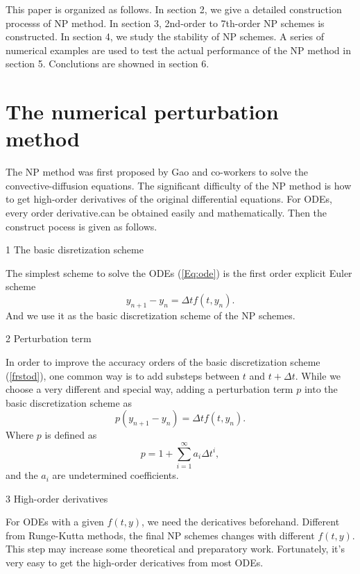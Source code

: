 \documentclass[review]{elsarticle}
\theoremstyle{plain}\newtheorem{definition}{\sc{Definition}}
\theoremstyle{defination}\newtheorem{example}{Example}[section]
\numberwithin{equation}{section}
\numberwithin{table}{section}
\begin{document}
{This paper is organized as follows. In section 2, we give a detailed construction processs of NP method. In section 3, 2nd-order to 7th-order NP schemes is constructed. In section 4, we study the stability of NP schemes. A series of numerical examples are used to test the actual performance of the NP method in section 5.  Conclutions are showned in section 6.   

\section{The numerical perturbation method}
The NP method was first proposed by Gao and co-workers to solve the convective-diffusion equations. The significant difficulty of the NP method is how  to get high-order derivatives of the original differential equations. For ODEs, every order derivative.can be obtained easily and mathematically.  Then the construct pocess is given as follows.

\textcircled{\small{1}} The basic disretization scheme

The simplest scheme to solve the ODEs (\ref{Eq:ode}) is the first order explicit Euler scheme
\begin{equation}\label{frstod}
  y_{n+1}-y_n=\Delta t f(t,y_n).
\end{equation}
And we use it as the  basic discretization scheme of the NP schemes.

\textcircled{\small{2}} Perturbation term

In order to improve the accuracy orders of the basic discretization scheme (\ref{frstod}), one common way is to add substeps between $t$ and $t+\Delta t$. While  we choose a  very different and special way, adding  a perturbation term $p$ into the basic discretization scheme as
\begin{equation}\label{eq:pEuler}
  p(y_{n+1}-y_n)=\Delta t f(t,y_n).
  \end{equation}
Where $p$ is defined as
\begin{equation}
  p=1+\sum\limits_{i=1}^{\infty}a_i\Delta t^i,
  \end{equation}
and the $a_i$ are undetermined coefficients. 

\textcircled{\small {3}} High-order derivatives

For ODEs with a given $f(t,y)$, we need the dericatives beforehand. Different from Runge-Kutta methods, the final NP schemes changes with different $f(t,y)$. This step may increase some theoretical and preparatory work. Fortunately, it's very easy to get the  high-order dericatives from most ODEs.

}
\end{document}
